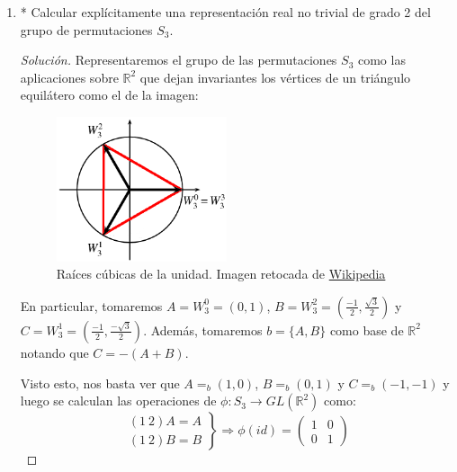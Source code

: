 \documentclass[paper=a4, fontsize=11pt, spanish]{scrartcl}
\begin{document}
\begin{enumerate}
\begin{proof}
			Como contraejemplo, nos iremos al álgebra $M_2(\mathbb{F}_2)$ y tomaremos $a = I_2$, $\displaystyle
			b = \begin{pmatrix} 1 & 0 \\ 0 & 0 \end{pmatrix}$, entonces $\displaystyle e = a+b = \begin{pmatrix}
			0 & 0 \\ 0 & 1 \end{pmatrix}$, claramente todas son idempotentes pero $ab = ba = b \neq 0_{2,2}$.
		\end{proof}
	
		\item * Calcular explícitamente una representación real no trivial de grado 2 del grupo de permutaciones
		$S_3$.
		\begin{proof}[Solución]
			Representaremos el grupo de las permutaciones $S_3$ como las aplicaciones sobre $\mathbb{R}^2$ que
			dejan invariantes los vértices de un triángulo equilátero como el de la imagen:
			
			\begin{figure}[H]
				\centering
				\includegraphics[width=5cm]{./3rd-roots-of-unity.png}
				\caption{Raíces cúbicas de la unidad. Imagen retocada de
				\href{https://upload.wikimedia.org/wikipedia/commons/3/3a/3rd-roots-of-unity.png}{Wikipedia}}
			\end{figure}
			
			En particular, tomaremos $A = W_3^0 = (0, 1)$, $\displaystyle B = W_3^2 = \left(\frac{-1}{2},
			\frac{\sqrt{3}}{2}\right)$ y $\displaystyle C = W_3^1 = \left(\frac{-1}{2}, \frac{-\sqrt{3}}{2}\right)$.
			Además, tomaremos $b=\{A, B\}$ como base de $\mathbb{R}^2$ notando que $C = -(A+B)$.
			
			Visto esto, nos basta ver que $A =_b (1, 0)$, $B =_b (0, 1)$ y $C =_b (-1, -1)$ y luego se calculan
			las operaciones de $\phi: S_3 \rightarrow GL\left(\mathbb{R}^2\right)$ como:
			$$\left.\begin{aligned}
				(1\ 2)A = A\\
				(1\ 2)B = B
			\end{aligned}\right\} \Rightarrow\phi(id) = \begin{pmatrix} 1 & 0\\ 0 & 1 \end{pmatrix}$$
			

\end{proof}
\end{enumerate}
\end{document}

